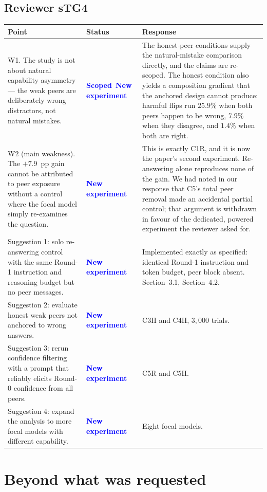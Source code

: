 \documentclass[11pt]{article}
\newcommand{\newexp}{\textcolor{blue}{\textbf{New experiment}}}
\newcommand{\scoped}{\textcolor{blue}{\textbf{Scoped}}}
\begin{document}
\subsection*{Reviewer sTG4}

\begin{longtable}{@{}p{}p{}p{}@{}}
\toprule
\textbf{Point} & \textbf{Status} & \textbf{Response} \\
\midrule
\endhead
W1. The study is not about natural capability asymmetry --- the weak peers are
deliberately wrong distractors, not natural mistakes.
& \scoped\ \newexp
& The honest-peer conditions supply the natural-mistake comparison directly,
  and the claims are re-scoped. The honest condition also yields a
  composition gradient that the anchored design cannot produce: harmful flips
  run $25.9\%$ when both peers happen to be wrong, $7.9\%$ when they disagree,
  and $1.4\%$ when both are right. \\
\addlinespace
W2 (main weakness). The $+7.9$~pp gain cannot be attributed to peer exposure
without a control where the focal model simply re-examines the question.
& \newexp
& This is exactly C1R, and it is now the paper's second experiment. Re-answering
  alone reproduces none of the gain. We had noted in our response that C5's
  total peer removal made an accidental partial control; that argument is
  withdrawn in favour of the dedicated, powered experiment the reviewer asked
  for. \\
\addlinespace
Suggestion 1: solo re-answering control with the same Round-1 instruction and
reasoning budget but no peer messages.
& \newexp
& Implemented exactly as specified: identical Round-1 instruction and token
  budget, peer block absent. Section~3.1, Section~4.2. \\
\addlinespace
Suggestion 2: evaluate honest weak peers not anchored to wrong answers.
& \newexp
& C3H and C4H, $3{,}000$ trials. \\
\addlinespace
Suggestion 3: rerun confidence filtering with a prompt that reliably elicits
Round-0 confidence from all peers.
& \newexp
& C5R and C5H. \\
\addlinespace
Suggestion 4: expand the analysis to more focal models with different
capability.
& \newexp
& Eight focal models. \\
\bottomrule
\end{longtable}

\section*{Beyond what was requested}
\end{document}
